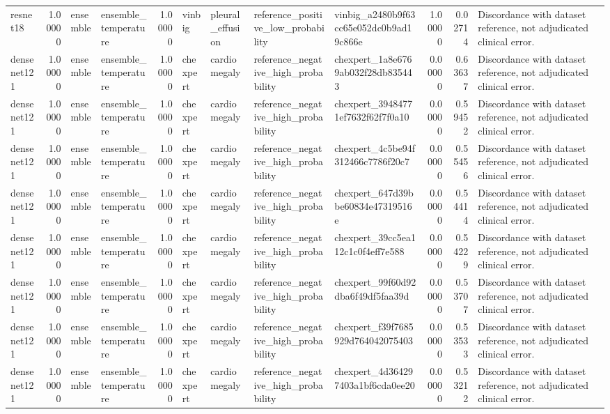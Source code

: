 \begin{tabular}{lrllrllllrrl}
resnet18 & 1.00000 & ensemble & ensemble\_temperature & 1.00000 & vinbig & pleural\_effusion & reference\_positive\_low\_probability & vinbig\_a2480b9f63cc65e052dc0b9ad19c866e & 1.00000 & 0.02714 & Discordance with dataset reference, not adjudicated clinical error. \\
densenet121 & 1.00000 & ensemble & ensemble\_temperature & 1.00000 & chexpert & cardiomegaly & reference\_negative\_high\_probability & chexpert\_1a8e6769ab032f28db835443 & 0.00000 & 0.63637 & Discordance with dataset reference, not adjudicated clinical error. \\
densenet121 & 1.00000 & ensemble & ensemble\_temperature & 1.00000 & chexpert & cardiomegaly & reference\_negative\_high\_probability & chexpert\_39484771ef7632f62f7f0a10 & 0.00000 & 0.59452 & Discordance with dataset reference, not adjudicated clinical error. \\
densenet121 & 1.00000 & ensemble & ensemble\_temperature & 1.00000 & chexpert & cardiomegaly & reference\_negative\_high\_probability & chexpert\_4c5be94f312466c7786f20c7 & 0.00000 & 0.55456 & Discordance with dataset reference, not adjudicated clinical error. \\
densenet121 & 1.00000 & ensemble & ensemble\_temperature & 1.00000 & chexpert & cardiomegaly & reference\_negative\_high\_probability & chexpert\_647d39bbe60834e47319516e & 0.00000 & 0.54414 & Discordance with dataset reference, not adjudicated clinical error. \\
densenet121 & 1.00000 & ensemble & ensemble\_temperature & 1.00000 & chexpert & cardiomegaly & reference\_negative\_high\_probability & chexpert\_39cc5ea112c1c0f4eff7e588 & 0.00000 & 0.54229 & Discordance with dataset reference, not adjudicated clinical error. \\
densenet121 & 1.00000 & ensemble & ensemble\_temperature & 1.00000 & chexpert & cardiomegaly & reference\_negative\_high\_probability & chexpert\_99f60d92dba6f49df5faa39d & 0.00000 & 0.53707 & Discordance with dataset reference, not adjudicated clinical error. \\
densenet121 & 1.00000 & ensemble & ensemble\_temperature & 1.00000 & chexpert & cardiomegaly & reference\_negative\_high\_probability & chexpert\_f39f7685929d764042075403 & 0.00000 & 0.53533 & Discordance with dataset reference, not adjudicated clinical error. \\
densenet121 & 1.00000 & ensemble & ensemble\_temperature & 1.00000 & chexpert & cardiomegaly & reference\_negative\_high\_probability & chexpert\_4d364297403a1bf6cda0ee20 & 0.00000 & 0.53212 & Discordance with dataset reference, not adjudicated clinical error. \\

\end{tabular}

